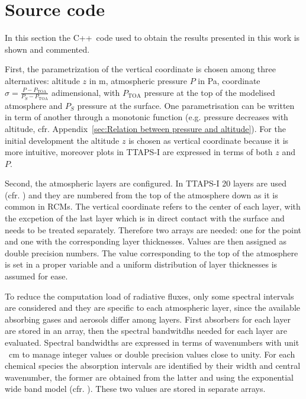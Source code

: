\documentclass[a4paper,10pt,twocolumn,\classoptions]{article}
\newcommand{\cpp}{C++}
\newcommand{\PTOA}{P_\text{TOA}}
\begin{document}

\newpage
\appendix

\section{Source code}
In this section the \cpp\ code used to obtain the results presented in this work is shown and commented.

First, the parametrization of the vertical coordinate is chosen among three alternatives: altitude $z$ in \unit{\metre}, atmospheric pressure $P$ in \unit{\pascal}, coordinate $\sigma = \frac{P - \PTOA}{P_S - \PTOA}$ adimensional, with $\PTOA$ pressure at the top of the modelised atmosphere and $P_S$ pressure at the surface. One parametrisation can be written in term of another through a monotonic function (e.g. pressure decreases with altitude, cfr. Appendix~\ref{sec:Relation between pressure and altitude}). For the initial development the altitude $z$ is chosen as vertical coordinate because it is more intuitive, moreover plots in TTAPS-I are expressed in terms of both $z$ and $P$.

Second, the atmospheric layers are configured. In TTAPS-I 20 layers are used (cfr. \cite[396]{NuclearWinterPhysics}) and they are numbered from the top of the atmosphere down as it is common in RCMs. The vertical coordinate refers to the center of each layer, with the excpetion of the last layer which is in direct contact with the surface and needs to be treated separately. %
Therefore two arrays are needed: one for the point and one with the corresponding layer thicknesses. Values are then assigned as double precision numbers. The value corresponding to the top of the atmosphere is set in a proper variable and a uniform distribution of layer thicknesses is assumed for ease.

To reduce the computation load of radiative fluxes, only some spectral intervals are considered and they are specific to each atmospheric layer, since the available absorbing gases and aerosols differ among layers. First absorbers for each layer are stored in an array, then the spectral bandwitdhs needed for each layer are evaluated. Spectral bandwidths are expressed in terms of wavenumbers with unit \unit{\per\centi\metre} to manage integer values or double precision values close to unity. For each chemical species the absorption intervals are identified by their width and central wavenumber, the former are obtained from the latter and using the exponential wide band model (cfr. \cite[360]{Modest}). These two values are stored in separate arrays.
\end{document}
